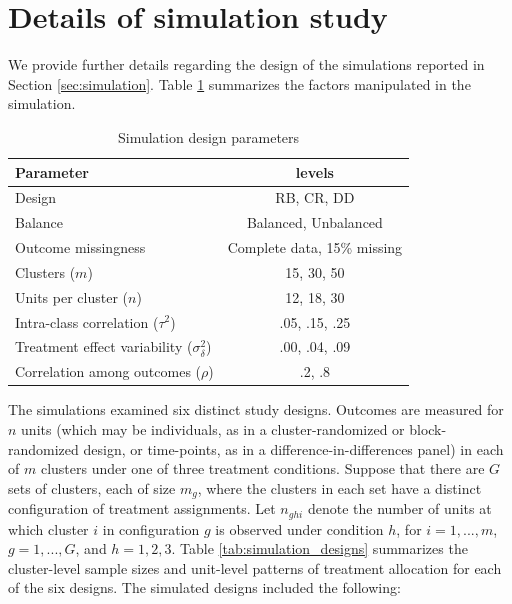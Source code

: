\documentclass[12pt]{article}
\begin{document}
\newpage

\hypertarget{app:simulations}{%
\section{Details of simulation study}\label{app:simulations}}

We provide further details regarding the design of the simulations
reported in Section \ref{sec:simulation}. Table
\ref{tab:simulation_parameters} summarizes the factors manipulated in
the simulation.

\begin{table}[hbt]
\centering
\caption{Simulation design parameters} 
\label{tab:simulation_parameters}
\begin{tabular}{lc}
\toprule
Parameter & levels \\ \midrule
Design & RB, CR, DD \\
Balance & Balanced, Unbalanced \\
Outcome missingness & Complete data, 15\% missing \\
Clusters ($m$) & 15, 30, 50 \\
Units per cluster ($n$) & 12, 18, 30 \\
Intra-class correlation ($\tau^2$) & .05, .15, .25 \\
Treatment effect variability ($\sigma_\delta^2$) & .00, .04, .09 \\ 
Correlation among outcomes ($\rho$) & .2, .8 \\
\bottomrule
\end{tabular}
\end{table}

The simulations examined six distinct study designs. Outcomes are
measured for \(n\) units (which may be individuals, as in a
cluster-randomized or block-randomized design, or time-points, as in a
difference-in-differences panel) in each of \(m\) clusters under one of
three treatment conditions. Suppose that there are \(G\) sets of
clusters, each of size \(m_g\), where the clusters in each set have a
distinct configuration of treatment assignments. Let \(n_{ghi}\) denote
the number of units at which cluster \(i\) in configuration \(g\) is
observed under condition \(h\), for \(i=1,...,m\), \(g = 1,...,G\), and
\(h = 1,2,3\). Table \ref{tab:simulation_designs} summarizes the
cluster-level sample sizes and unit-level patterns of treatment
allocation for each of the six designs. The simulated designs included
the following:\\
\end{document}
